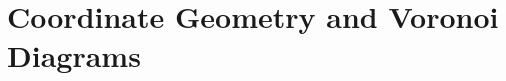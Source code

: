 \documentclass[../../main.tex]{subfiles}
\begin{document}
\chapter{Coordinate Geometry and Voronoi Diagrams}
\end{document}
